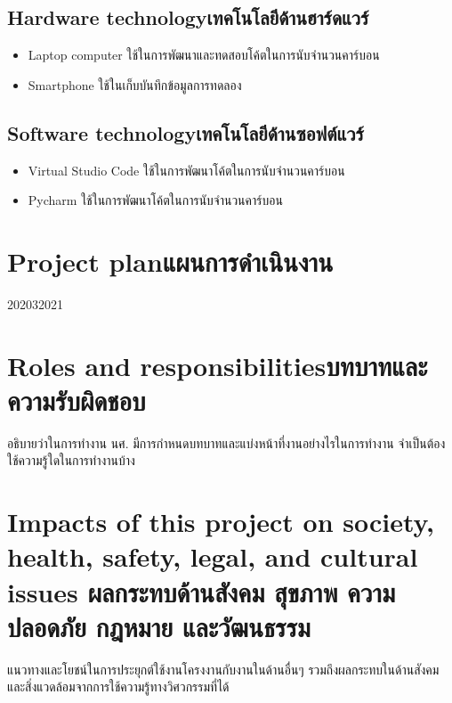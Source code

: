 \subsection{\ifenglish Hardware technology\else เทคโนโลยีด้านฮาร์ดแวร์\fi}
\begin{itemize}
    \item{Laptop computer ใช้ในการพัฒนาและทดสอบโค้ตในการนับจำนวนคาร์บอน}
    \item{Smartphone ใช้ในเก็บบันทึกข้อมูลการทดลอง}
\end{itemize}

\subsection{\ifenglish Software technology\else เทคโนโลยีด้านซอฟต์แวร์\fi}
\begin{itemize}
    \item{Virtual Studio Code ใช้ในการพัฒนาโค้ตในการนับจำนวนคาร์บอน}
    \item{Pycharm ใช้ในการพัฒนาโค้ตในการนับจำนวนคาร์บอน}
\end{itemize}

\section{\ifenglish Project plan\else แผนการดำเนินงาน\fi}

\begin{plan}{10}{2020}{3}{2021}
\end{plan}

\section{\ifenglish Roles and responsibilities\else บทบาทและความรับผิดชอบ\fi}
อธิบายว่าในการทำงาน นศ. มีการกำหนดบทบาทและแบ่งหน้าที่งานอย่างไรในการทำงาน จำเป็นต้องใช้ความรู้ใดในการทำงานบ้าง

\section{\ifenglish%
Impacts of this project on society, health, safety, legal, and cultural issues
\else%
ผลกระทบด้านสังคม สุขภาพ ความปลอดภัย กฎหมาย และวัฒนธรรม
\fi}

แนวทางและโยชน์ในการประยุกต์ใช้งานโครงงานกับงานในด้านอื่นๆ รวมถึงผลกระทบในด้านสังคมและสิ่งแวดล้อมจากการใช้ความรู้ทางวิศวกรรมที่ได้
